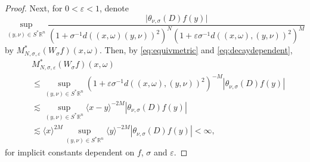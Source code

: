 \documentclass[10pt,a4paper]{amsart}
\newcommand {\Rn}{\mathbb{R}^{n}}
\newcommand {\Sp}{S^{*}\Rn}
\newcommand {\lb}{\langle}
\newcommand {\rb}{\rangle}
\newcommand {\veps}{\varepsilon}
\begin{document}
\begin{proof}
Next, for $0<\veps<1$, denote 
\[
\sup_{(y,\nu)\in\Sp}\frac{\big|\theta_{\nu,{\sigma}}(D)f(y)\big|}{(1+\sigma^{-1}d((x,\omega)(y,\nu))^{2})^{N}(1+\veps\sigma^{-1} d((x,\omega),(y,\nu))^{2})^{M}}
\]
by $M_{N,\sigma,\veps}^{*}(W_{\sigma}f)(x,\omega)$.
Then, by \eqref{eq:equivmetric} and \eqref{eq:decaydependent},
\begin{equation}\label{eq:Mepsfinite}
\begin{aligned}
&M_{N,\sigma,\veps}^{*}(W_{\sigma}f)(x,\omega)\\
&\leq\sup_{(y,\nu)\in\Sp}(1+\veps\sigma^{-1} d((x,\omega),(y,\nu))^{2})^{-M}|\theta_{\nu,\sigma}(D)f(y)|\\
&\lesssim \sup_{(y,\nu)\in\Sp}\lb x-y\rb^{-2M}|\theta_{\nu,\sigma}(D)f(y)|\\
&\lesssim\lb x\rb^{2M}\sup_{(y,\nu)\in\Sp}\lb y\rb^{-2M}|\theta_{\nu,{\sigma}}(D)f(y)|<\infty,
\end{aligned}
\end{equation}
for implicit constants dependent on $f$, $\sigma$ and $\veps$. 


\end{proof}
\end{document}
